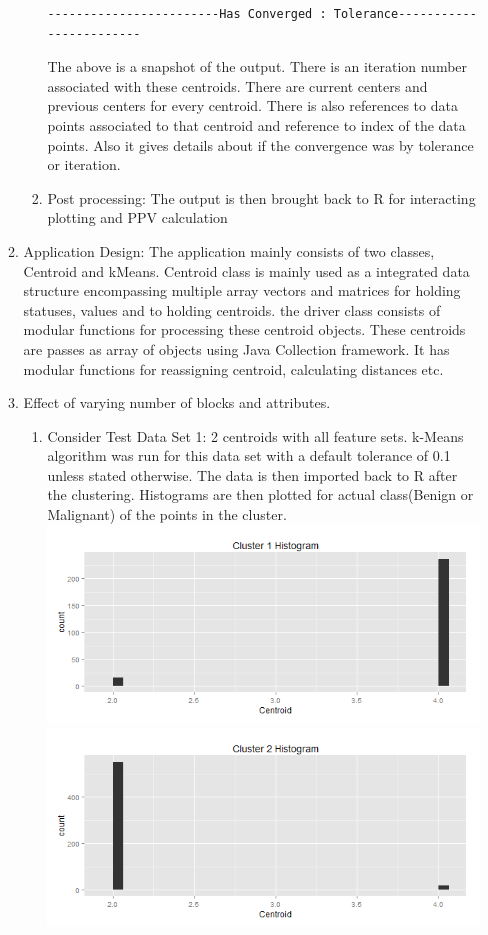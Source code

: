 \documentclass{article}
\begin{document}
\begin{enumerate}
\begin{enumerate}
\begin{enumerate}
\begin{verbatim}
------------------------Has Converged : Tolerance------------------------
\end{verbatim}
The above is a snapshot of the output. There is an iteration number associated with these centroids. There are current centers and previous centers for every centroid. There is also references to data points associated to that centroid and reference to index of the data points. Also it gives details about if the convergence was by tolerance or iteration.
\item Post processing: The output is then brought back to R for interacting plotting and PPV calculation
\end{enumerate}
\item Application Design: The application mainly consists of two classes, Centroid and kMeans. Centroid class is mainly used as a integrated data structure encompassing multiple array vectors and matrices for holding statuses, values and to holding centroids. the driver class consists of modular functions for processing these centroid objects. These centroids are passes as array of objects using Java Collection framework. It has modular functions for reassigning centroid, calculating distances etc.
\item Effect of varying number of blocks and attributes.
\begin{enumerate}
\item Consider Test Data Set 1: 2 centroids with all feature sets. k-Means algorithm was run for this data set with a default tolerance of 0.1 unless stated otherwise. The data is then imported back to R after the clustering. Histograms are then plotted for actual class(Benign or Malignant) of the points in the cluster.\\
\includegraphics[scale=0.5]{test1_1.png}\\
\includegraphics[scale=0.5]{test1_2.png}\\

\end{enumerate}
\end{enumerate}
\end{enumerate}
\end{document}
